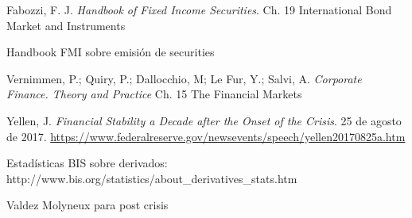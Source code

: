 \documentclass{nuevotema}
\begin{document}
Fabozzi, F. J. \textit{Handbook of Fixed Income Securities}. Ch. 19 International Bond Market and Instruments

Handbook FMI sobre emisión de securities

Vernimmen, P.; Quiry, P.; Dallocchio, M; Le Fur, Y.; Salvi, A. \textit{Corporate Finance. Theory and Practice} Ch. 15 The Financial Markets

Yellen, J. \textit{Financial Stability a Decade after the Onset of the Crisis}. 25 de agosto de 2017. \url{https://www.federalreserve.gov/newsevents/speech/yellen20170825a.htm}

Estadísticas BIS sobre derivados: http://www.bis.org/statistics/about\_derivatives\_stats.htm

Valdez Molyneux para post crisis
\end{document}
